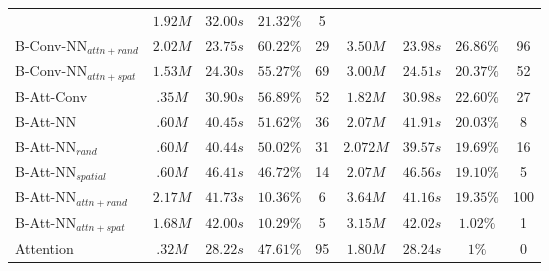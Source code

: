 \documentclass{article}
\begin{document}
\begin{table}[h]
\begin{threeparttable}
\begin{tabular*}{\textwidth}{@{\extracolsep\fill}l|cccc|cccc}
                                      & \(1.92M\) & \(32.00s\) & \(21.32\%\) & 5\\
      B-Conv-NN\(_{attn+rand}\)       & \(2.02M\) & \(23.75s\) & \(60.22\%\) & 29
                                      & \(3.50M\) & \(23.98s\) & \(26.86\%\) & 96\\
      B-Conv-NN\(_{attn+spat}\)       & \(1.53M\) & \(24.30s\) & \(55.27\%\) & 69 
                                      & \(3.00M\) & \(24.51s\) & \(20.37\%\) & 52 \\
      \midrule 
      B-Att-Conv                      & \(.35M\) & \(30.90s\) & \(56.89\%\) & 52
                                      & \(1.82M\) & \(30.98s\) & \(22.60\%\) & 27\\

      \midrule 
      B-Att-NN                        & \(.60M\) & \(40.45s\) & \(51.62\%\) & 36
                                      & \(2.07M\) & \(41.91s\) & \(20.03\%\) & 8\\
      B-Att-NN\(_{rand}\)             & \(.60M\) & \(40.44s\) & \(50.02\%\) & 31
                                      & \(2.072M\) & \(39.57s\) & \(19.69\%\) & 16\\
      B-Att-NN\(_{spatial}\)          & \(.60M\) & \(46.41s\) & \(46.72\%\) & 14
                                      & \(2.07M\) & \(46.56s\) & \(19.10\%\) & 5\\
      B-Att-NN\(_{attn+rand}\)        & \(2.17M\) & \(41.73s\) & \(10.36\%\) & 6
                                      & \(3.64M\) & \(41.16s\) & \(19.35\%\) & 100\\
      B-Att-NN\(_{attn+spat}\)        & \(1.68M\) & \(42.00s\) & \(10.29\%\) & 5
                                      & \(3.15M\) & \(42.02s\) & \(1.02\%\) & 1\\
                                            
      \midrule
      Attention                       & \(.32M\) & \(28.22s\) & \(47.61\%\) & 95 
                                      & \(1.80M\) & \(28.24s\) & \(1\%\) & 0\\

      \bottomrule
    \end{tabular*}
    
  \end{threeparttable}
\end{table}
\end{document}
